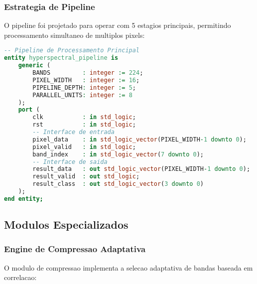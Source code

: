 \subsubsection{Estrategia de Pipeline}
O pipeline foi projetado para operar com 5 estagios principais, permitindo processamento simultaneo de multiplos pixels:

\begin{lstlisting}[language=VHDL]
-- Pipeline de Processamento Principal
entity hyperspectral_pipeline is
    generic (
        BANDS         : integer := 224;
        PIXEL_WIDTH   : integer := 16;
        PIPELINE_DEPTH: integer := 5;
        PARALLEL_UNITS: integer := 8
    );
    port (
        clk           : in std_logic;
        rst           : in std_logic;
        -- Interface de entrada
        pixel_data    : in std_logic_vector(PIXEL_WIDTH-1 downto 0);
        pixel_valid   : in std_logic;
        band_index    : in std_logic_vector(7 downto 0);
        -- Interface de saida
        result_data   : out std_logic_vector(PIXEL_WIDTH-1 downto 0);
        result_valid  : out std_logic;
        result_class  : out std_logic_vector(3 downto 0)
    );
end entity;
\end{lstlisting}

\subsection{Modulos Especializados}

\subsubsection{Engine de Compressao Adaptativa}
O modulo de compressao implementa a selecao adaptativa de bandas baseada em correlacao:

